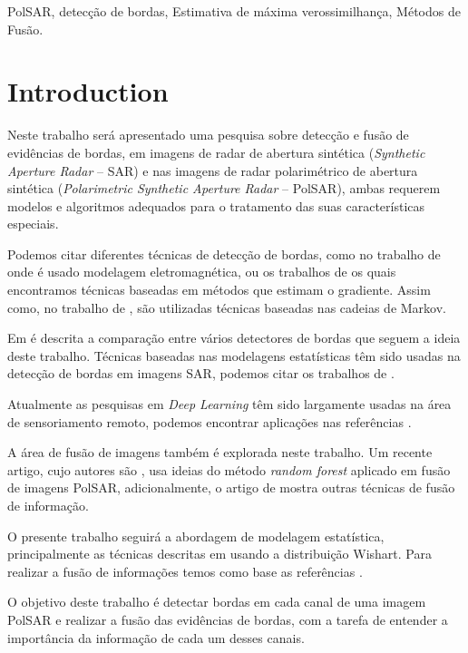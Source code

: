 \documentclass[conference]{IEEEtran}
\begin{document}
\begin{IEEEkeywords}
PolSAR, detecção de bordas, Estimativa de máxima verossimilhança, Métodos de Fusão.
\end{IEEEkeywords}

\section{Introduction}\label{sec_01}
Neste trabalho será apresentado uma pesquisa sobre detecção e fusão de evidências de bordas, em imagens de radar de abertura sintética (\textit{Synthetic Aperture Radar} -- SAR) e nas imagens de radar polarimétrico de abertura sintética (\textit{Polarimetric Synthetic Aperture Radar} -- PolSAR), ambas requerem modelos e algoritmos adequados para o tratamento das suas características especiais.

Podemos citar diferentes técnicas de detecção de bordas, como no trabalho de \cite{slf_2008} onde é usado modelagem eletromagnética, ou os trabalhos de \cite{tlb, obw, flmc, fyf} os quais encontramos técnicas baseadas em métodos que estimam o gradiente. Assim como, no trabalho de \cite{bf}, são utilizadas técnicas baseadas nas cadeias de Markov. 

Em \cite{gfn} é descrita a comparação entre vários detectores de bordas que seguem a ideia deste trabalho. Técnicas baseadas nas modelagens estatísticas têm sido usadas na detecção de bordas em imagens SAR, podemos citar os trabalhos de \cite{gmbf, fbgm, horrit, gfn}. 

Atualmente as pesquisas em \textit{Deep Learning} têm sido largamente usadas na área de sensoriamento remoto, podemos encontrar aplicações nas referências \cite{bac, ztmxzxf, tabmm, xstz}. 

A área de fusão de imagens também é explorada neste trabalho. 
Um recente artigo, cujo autores são \cite{sglmla}, usa ideias do método \textit{random forest} aplicado em fusão de imagens PolSAR, adicionalmente, o artigo de \cite{sg} mostra outras técnicas de fusão de informação.  

O presente trabalho seguirá a abordagem de modelagem estatística, principalmente as técnicas descritas em \cite{fbgm, nhfc} usando a distribuição Wishart. Para realizar a fusão de informações temos como base as referências \cite{mit, sg}. 

O objetivo deste trabalho é detectar bordas em cada canal de uma imagem PolSAR e realizar a fusão das evidências de bordas, com a tarefa de entender a importância da informação de cada um desses canais. 
\end{document}
